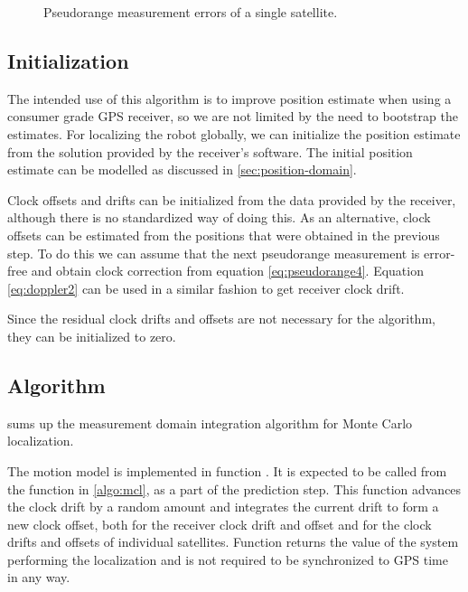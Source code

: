 \begin{figure}[p]
	\centering
	\caption{Pseudorange measurement errors of a single satellite.}
	\label{fig:pseudorange-errors}
\end{figure}


\subsection{Initialization}
The intended use of this algorithm is to improve position estimate when using
a consumer grade GPS receiver, so we are not limited by the need to bootstrap the estimates.
For localizing the robot globally, we can initialize the position
estimate from the solution provided by the receiver's software.
The initial position estimate can be modelled as discussed in \cref{sec:position-domain}.

Clock offsets and drifts can be initialized from the data provided by the
receiver, although there is no standardized way of doing this.
As an alternative, clock offsets can be estimated from the positions that were obtained in
the previous step.
To do this we can assume that the next pseudorange measurement is error-free
and obtain clock correction from equation \eqref{eq:pseudorange4}.
Equation \eqref{eq:doppler2} can be used in a similar fashion to get receiver clock drift.

Since the residual clock drifts and offsets are not necessary for the algorithm,
they can be initialized to zero.

\subsection{Algorithm}
 sums up the measurement domain integration
algorithm for Monte Carlo localization.

The motion model is implemented in function \predictGPS{}.
It is expected to be called from the function \sampleFromActionModel{} in \cref{algo:mcl},
as a part of the prediction step.
This function advances the clock drift by a random amount
and integrates the current drift to form a new clock offset,
both for the receiver clock drift and offset and for the
clock drifts and offsets of individual satellites.
Function \timeFunc{} returns the value of the system performing the localization
and is not required to be synchronized to GPS time in any way.

